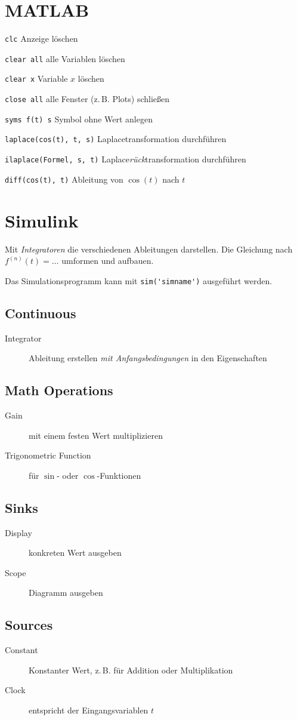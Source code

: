 \documentclass[%
	paper=a4,%
	pagesize=auto	%
	]{scrartcl}
\begin{document}
\appendix
\section{MATLAB}
	\lstinline=clc=
	Anzeige löschen

	\lstinline=clear all=
	alle Variablen löschen

	\lstinline=clear x=
	Variable \(x\) löschen

	\lstinline=close all=
	alle Fenster (z.\,B. Plots) schließen

	\lstinline=syms f(t) s=
	Symbol ohne Wert anlegen

	\lstinline=laplace(cos(t), t, s)=
	Laplacetransformation durchführen

	\lstinline=ilaplace(Formel, s, t)=
	Laplace\emph{rück}transformation durchführen

	\lstinline=diff(cos(t), t)=
	Ableitung von \(\cos(t)\) nach \(t\)




\section{Simulink}
	Mit \emph{Integratoren} die verschiedenen Ableitungen darstellen.
	Die Gleichung nach \(f^{(n)}(t) = \dots\) umformen und aufbauen.

	Das Simulationsprogramm kann mit \lstinline=sim('simname')= ausgeführt
	werden.

\subsection{Continuous}
	\begin{description}
	\item[Integrator]
		Ableitung erstellen \emph{mit Anfangsbedingungen} in
		den Eigenschaften
	\end{description}

\subsection{Math Operations}
	\begin{description}
	\item[Gain]
		mit einem festen Wert multiplizieren
	\item[Trigonometric Function]
		für \(\sin\)- oder \(\cos\)-Funktionen
	\end{description}

\subsection{Sinks}
	\begin{description}
	\item[Display]
		konkreten Wert ausgeben
	\item[Scope]
		Diagramm ausgeben
	\end{description}

\subsection{Sources}
	\begin{description}
	\item[Constant]
		Konstanter Wert, z.\,B. für Addition oder Multiplikation
	\item[Clock]
		entspricht der Eingangsvariablen \(t\)
	\end{description}
\end{document}
